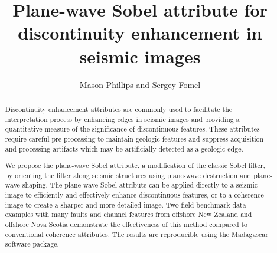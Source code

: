 \title{Plane-wave Sobel attribute for discontinuity enhancement in seismic images}
\author{Mason Phillips and Sergey Fomel}
\address{The University of Texas at Austin,\\
John A. and Katherine G. Jackson School of Geosciences,\\ Bureau of Economic Geology,\\
Austin, Texas, USA}



\maketitle
\begin{abstract}
Discontinuity enhancement attributes are commonly used to facilitate the interpretation process by enhancing edges in seismic images and providing a quantitative measure of the significance of discontinuous features. 
These attributes require careful pre-processing to maintain geologic features and suppress acquisition and processing artifacts which may be artificially detected as a geologic edge. 

We propose the plane-wave Sobel attribute, a modification of the classic Sobel filter, by orienting the filter along seismic structures using plane-wave destruction and plane-wave shaping. 
The plane-wave Sobel attribute can be applied directly to a seismic image to efficiently and effectively enhance discontinuous features, or to a coherence image to create a sharper and more detailed image.
Two field benchmark data examples with many faults and channel features from offshore New Zealand and offshore Nova Scotia demonstrate the effectiveness of this method compared to conventional coherence attributes.
The results are reproducible using the Madagascar software package.

\end{abstract}

